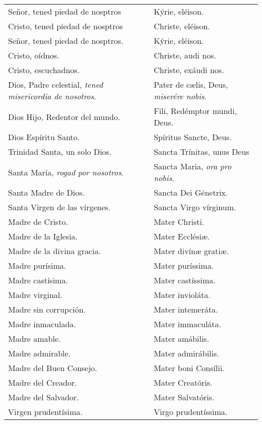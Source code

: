 \documentclass[./devocionario.tex]{subfiles}
\begin{document}
    \begin{longtable} { p{} p{} }
        Señor, tened piedad de nosptros & Kýrie, eléison.\\
        Cristo, tened piedad de nosptros & Christe, eléison.\\
        Señor, tened piedad de nosptros. & Kýrie, eléison.\\
        Cristo, oídnos. & Christe, audi nos.\\
        Cristo, escuchadnos. & Christe, exáudi nos.\\
        Dios, Padre celestial, \textit{tened misericordia de nosotros}. & Pater de cælis, Deus, \textit{miserére nobis}.\\
        Dios Hijo, Redentor del mundo. & Fili, Redémptor mundi, Deus.\\
        Dios Espíritu Santo. & Spíritus Sancte, Deus.\\
        Trinidad Santa, un solo Dios. & Sancta Trínitas, unus Deus\\
        Santa María, \textit{rogad por nosotros}. & Sancta Maria, \textit{ora pro nobis}.\\
        Santa Madre de Dios. & Sancta Dei Génetrix.\\
        Santa Virgen de las vírgenes. & Sancta Virgo vírginum.\\
        Madre de Cristo. & Mater Christi.\\
        Madre de la Iglesia. & Mater Ecclésiæ.\\
        Madre de la divina gracia. & Mater divínæ gratiæ.\\
        Madre purísima. & Mater puríssima.\\
        Madre castísima. & Mater castíssima.\\
        Madre virginal. & Mater invioláta.\\
        Madre sin corrupción. & Mater intemeráta.\\
        Madre inmaculada. & Mater immaculáta.\\
        Madre amable. & Mater amábilis.\\
        Madre admirable. & Mater admirábilis.\\
        Madre del Buen Consejo. & Mater boni Consílii.\\
        Madre del Creador. & Mater Creatóris.\\
        Madre del Salvador. & Mater Salvatóris.\\
        Virgen pru­den­tísima. & Virgo pru­den­tíssima.\\

\end{longtable}
\end{document}
